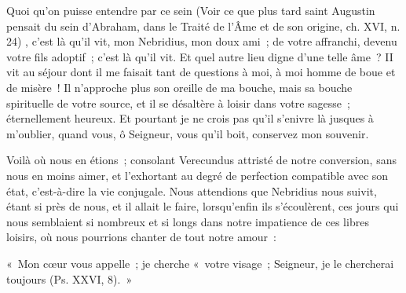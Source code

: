 \documentclass[french,twoside]{book} %
\newenvironment{quoteblock}%
  {\begin{quoting}}
  {\end{quoting}}
\newenvironment{quotebar}{%
    \def\FrameCommand{{\color{rubric!10!}\vrule width 0.5em} \hspace{0.9em}}%
    \def\OuterFrameSep{\itemsep} %
    \MakeFramed {\advance\hsize-\width \FrameRestore}
  }%
  {%
    \endMakeFramed
  }
\renewenvironment{quoteblock}%
  {%
    \savenotes
    \setstretch{0.9}
    \normalfont
    \begin{quotebar}
  }
  {%
    \end{quotebar}
    \spewnotes
  }
\begin{document}
 Quoi qu’on puisse entendre par ce sein (Voir ce que plus tard saint Augustin pensait du sein d’Abraham, dans le Traité de l’Âme et de son origine, ch. XVI, n. 24) , c’est là qu’il vit, mon Nebridius, mon doux ami ; de votre affranchi, devenu votre fils adoptif ; c’est là qu’il vit. Et quel autre lieu digne d’une telle âme ? II vit au séjour dont il me faisait tant de questions à moi, à moi homme de boue et de misère ! Il n’approche plus son oreille de ma bouche, mais sa bouche spirituelle de votre source, et il se désaltère à loisir dans votre sagesse ; éternellement heureux. Et pourtant je ne crois pas qu’il s’enivre là jusques à m’oublier, quand vous, ô Seigneur, vous qu’il boit, conservez mon souvenir.\par
Voilà où nous en étions ; consolant Verecundus attristé de notre conversion, sans nous en moins aimer, et l’exhortant au degré de perfection compatible avec son état, c’est-à-dire la vie conjugale. Nous attendions que Nebridius nous suivit, étant si près de nous, et il allait le faire, lorsqu’enfin ils s’écoulèrent, ces jours qui nous semblaient si nombreux et si longs dans notre impatience de ces libres loisirs, où nous pourrions chanter de tout notre amour :\par

\begin{quoteblock}
\noindent « Mon cœur vous appelle ; je cherche « votre visage ; Seigneur, je le chercherai toujours (Ps. XXVI, 8). »\end{quoteblock}
\end{document}
